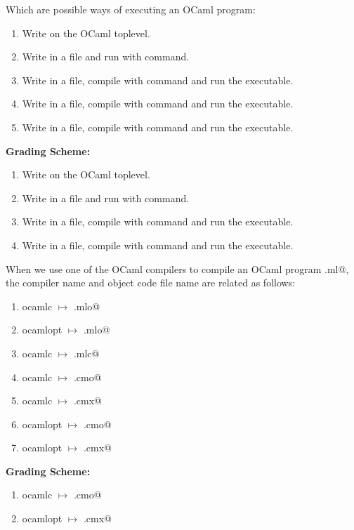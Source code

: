 \documentclass[addpoints,11pt]{exam}
\newcommand{\grade}[1]{{\color{red}\textbf{Grading Scheme:} #1}}
\begin{document}
\begin{questions}
\question Which are possible ways of executing an OCaml program:
\begin{enumerate}
\item Write on the OCaml toplevel.
\item Write in a file and run with \lstinline@ocaml@ command.
\item Write in a file, compile with \lstinline@ocamlc@ command and run the executable.
\item Write in a file, compile with \lstinline@ocamlopt@ command and run the executable.
\item Write in a file, compile with \lstinline@ocamlcom@ command and run the executable.
\end{enumerate}
\begin{solution}
\grade{
\begin{enumerate}
\item Write on the OCaml toplevel.
\item Write in a file and run with \lstinline@ocaml@ command.
\item Write in a file, compile with \lstinline@ocamlc@ command and run the executable.
\item Write in a file, compile with \lstinline@ocamlopt@ command and run the executable.
\end{enumerate}
}
\end{solution}

\question When we use one of the OCaml compilers to compile an OCaml program \lstinline@program.ml@, the compiler name and object code file name are related as follows:
\begin{enumerate}
\item ocamlc $\mapsto$ \lstinline@program.mlo@
\item ocamlopt $\mapsto$ \lstinline@program.mlo@
\item ocamlc $\mapsto$ \lstinline@program.mlc@
\item ocamlc $\mapsto$ \lstinline@program.cmo@
\item ocamlc $\mapsto$ \lstinline@program.cmx@
\item ocamlopt $\mapsto$ \lstinline@program.cmo@
\item ocamlopt $\mapsto$ \lstinline@program.cmx@
\end{enumerate}
\begin{solution}
\grade{
\begin{enumerate}
\item ocamlc $\mapsto$ \lstinline@program.cmo@
\item ocamlopt $\mapsto$ \lstinline@program.cmx@
\end{enumerate}
}
\end{solution}


\end{questions}
\end{document}
